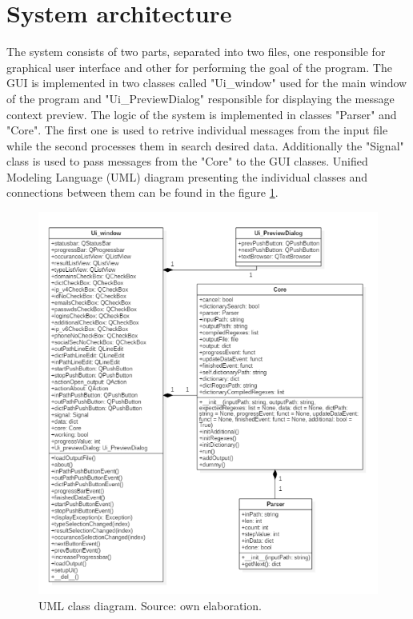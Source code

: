 \documentclass[a4paper,twoside,12pt]{book}
\begin{document}
\section{System architecture}

The system consists of two parts, separated into two files, one responsible for graphical user interface and other for
performing the goal of the program. The GUI is implemented in two classes called "Ui\_window" used for the main window of the program and "Ui\_PreviewDialog" responsible for displaying 
the message context preview. The logic of the system is implemented in classes "Parser" and "Core". The first one is used to retrive individual messages from the input file while the second
processes them in search desired data. Additionally the "Signal" class is used to pass messages from the "Core" to the GUI classes. Unified Modeling Language (UML) diagram presenting the 
individual classes and connections between them can be found in the figure \ref{fig:UMLdiagram}.

\begin{figure}
   \centering
   \includegraphics{Images/DiagramUML}
   \caption{UML class diagram. Source: own elaboration.}
   \label{fig:UMLdiagram}
\end{figure}
\end{document}
